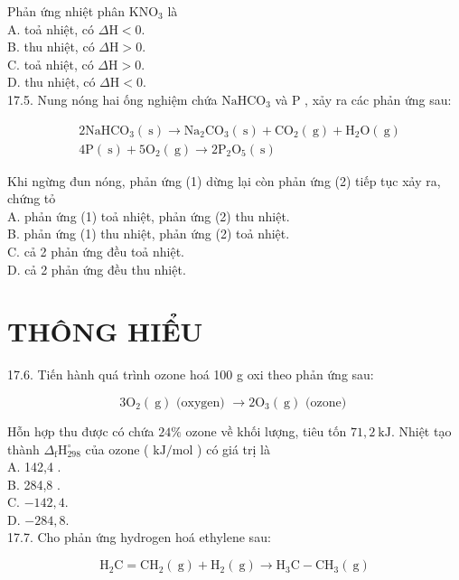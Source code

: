 \documentclass[10pt]{article}
\begin{document}
Phản ứng nhiệt phân $\mathrm{KNO}_{3}$ là\\
A. toả nhiệt, có $\Delta \mathrm{H}<0$.\\
B. thu nhiệt, có $\Delta \mathrm{H}>0$.\\
C. toả nhiệt, có $\Delta \mathrm{H}>0$.\\
D. thu nhiệt, có $\Delta \mathrm{H}<0$.\\
17.5. Nung nóng hai ống nghiệm chứa $\mathrm{NaHCO}_{3}$ và P , xảy ra các phản ứng sau:


\begin{align*}
& 2 \mathrm{NaHCO}_{3}(\mathrm{~s}) \rightarrow \mathrm{Na}_{2} \mathrm{CO}_{3}(\mathrm{~s})+\mathrm{CO}_{2}(\mathrm{~g})+\mathrm{H}_{2} \mathrm{O}(\mathrm{~g})  \tag{1}\\
& 4 \mathrm{P}(\mathrm{~s})+5 \mathrm{O}_{2}(\mathrm{~g}) \rightarrow 2 \mathrm{P}_{2} \mathrm{O}_{5}(\mathrm{~s}) \tag{2}
\end{align*}


Khi ngừng đun nóng, phản ứng (1) dừng lại còn phản ứng (2) tiếp tục xảy ra, chứng tỏ\\
A. phản ứng (1) toả nhiệt, phản ứng (2) thu nhiệt.\\
B. phản ứng (1) thu nhiệt, phản ứng (2) toả nhiệt.\\
C. cả 2 phản ứng đều toả nhiệt.\\
D. cả 2 phản ứng đều thu nhiệt.

\section*{THÔNG HIỂU}
17.6. Tiến hành quá trình ozone hoá 100 g oxi theo phản ứng sau:

$$
3 \mathrm{O}_{2}(\mathrm{~g}) \text { (oxygen) } \rightarrow 2 \mathrm{O}_{3}(\mathrm{~g}) \text { (ozone) }
$$

Hỗn hợp thu được có chứa $24 \%$ ozone về khối lượng, tiêu tốn $71,2 \mathrm{~kJ}$. Nhiệt tạo thành $\Delta_{\mathrm{f}} \mathrm{H}_{298}^{\circ}$ của ozone ( $\mathrm{kJ} / \mathrm{mol}$ ) có giá trị là\\
A. 142,4 .\\
B. 284,8 .\\
C. $-142,4$.\\
D. $-284,8$.\\
17.7. Cho phản ứng hydrogen hoá ethylene sau:

$$
\mathrm{H}_{2} \mathrm{C}=\mathrm{CH}_{2}(\mathrm{~g})+\mathrm{H}_{2}(\mathrm{~g}) \rightarrow \mathrm{H}_{3} \mathrm{C}-\mathrm{CH}_{3}(\mathrm{~g})
$$
\end{document}

